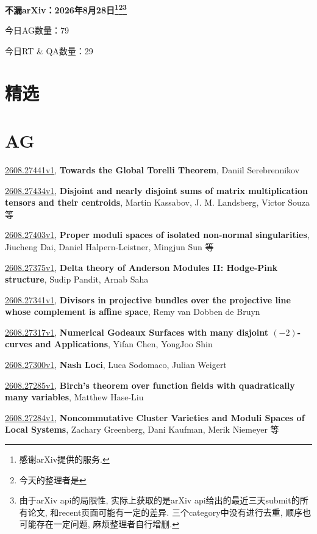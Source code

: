 \documentclass[9pt, a4paper]{article}
\theoremstyle{plain}
\theoremstyle{definition}
\theoremstyle{remark}
\newcommand{\arxiv}[3]{\href{https://arxiv.org/abs/#1}{#1}, \textbf{\textcolor{arxivblue}{#2}}, #3}
\newcommand{\AGnumber}{79}
\newcommand{\RTQAnumber}{29}
\newcommand{\NewestDate}{2026年8月28日}
\newcommand{\todayarXiver}{} %
\begin{document}
\begin{center}
    \Huge\textbf{不漏arXiv：\NewestDate\footnote{感谢arXiv提供的服务.}\footnote{今天的整理者是\todayarXiver}\footnote{由于arXiv api的局限性, 实际上获取的是arXiv api给出的最近三天submit的所有论文, 和recent页面可能有一定的差异. 三个category中没有进行去重, 顺序也可能存在一定问题, 麻烦整理者自行增删.}} \\
\end{center}

\setcounter{section}{-1}

\begin{center}
    今日AG数量：\AGnumber
    
    今日RT \& QA数量：\RTQAnumber
    
\end{center}


\section{精选}


\section{AG}
\arxiv{2608.27441v1}{Towards the Global Torelli Theorem}{Daniil Serebrennikov}

\arxiv{2608.27434v1}{Disjoint and nearly disjoint sums of matrix multiplication tensors and their centroids}{Martin Kassabov, J. M. Landsberg, Victor Souza 等}

\arxiv{2608.27403v1}{Proper moduli spaces of isolated non-normal singularities}{Jiucheng Dai, Daniel Halpern-Leistner, Mingjun Sun 等}

\arxiv{2608.27375v1}{Delta theory of Anderson Modules II: Hodge-Pink structure}{Sudip Pandit, Arnab Saha}

\arxiv{2608.27341v1}{Divisors in projective bundles over the projective line whose complement is affine space}{Remy van Dobben de Bruyn}

\arxiv{2608.27317v1}{Numerical Godeaux Surfaces with many disjoint $(-2)$-curves and Applications}{Yifan Chen, YongJoo Shin}

\arxiv{2608.27300v1}{Nash Loci}{Luca Sodomaco, Julian Weigert}

\arxiv{2608.27285v1}{Birch's theorem over function fields with quadratically many variables}{Matthew Hase-Liu}

\arxiv{2608.27284v1}{Noncommutative Cluster Varieties and Moduli Spaces of Local Systems}{Zachary Greenberg, Dani Kaufman, Merik Niemeyer 等}
\end{document}
